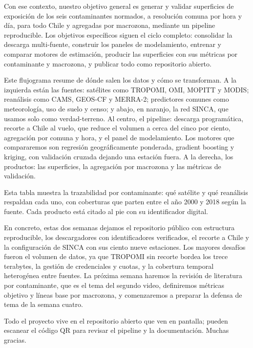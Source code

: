 Con ese contexto, nuestro objetivo general es generar y validar superficies de exposición de los seis contaminantes normados, a resolución comuna por hora y día, para todo Chile y agregadas por macrozona, mediante un pipeline reproducible. Los objetivos específicos siguen el ciclo completo: consolidar la descarga multi-fuente, construir los paneles de modelamiento, entrenar y comparar motores de estimación, producir las superficies con sus métricas por contaminante y macrozona, y publicar todo como repositorio abierto.

Este flujograma resume de dónde salen los datos y cómo se transforman. A la izquierda están las fuentes: satélites como TROPOMI, OMI, MOPITT y MODIS; reanálisis como CAMS, GEOS-CF y MERRA-2; predictores comunes como meteorología, uso de suelo y censo; y abajo, en naranjo, la red SINCA, que usamos solo como verdad-terreno. Al centro, el pipeline: descarga programática, recorte a Chile al vuelo, que reduce el volumen a cerca del cinco por ciento, agregación por comuna y hora, y el panel de modelamiento. Los motores que compararemos son regresión geográficamente ponderada, gradient boosting y kriging, con validación cruzada dejando una estación fuera. A la derecha, los productos: las superficies, la agregación por macrozona y las métricas de validación.

Esta tabla muestra la trazabilidad por contaminante: qué satélite y qué reanálisis respaldan cada uno, con coberturas que parten entre el año 2000 y 2018 según la fuente. Cada producto está citado al pie con su identificador digital.

 En concreto, estas dos semanas dejamos el repositorio público con estructura reproducible, los descargadores con identificadores verificados, el recorte a Chile y la configuración de SINCA con sus ciento nueve estaciones.  Los mayores desafíos fueron el volumen de datos, ya que TROPOMI sin recorte bordea los trece terabytes, la gestión de credenciales y cuotas, y la cobertura temporal heterogénea entre fuentes.  La próxima semana haremos la revisión de literatura por contaminante, que es el tema del segundo video, definiremos métricas objetivo y líneas base por macrozona, y comenzaremos a preparar la defensa de tema de la semana cuatro.

Todo el proyecto vive en el repositorio abierto que ven en pantalla; pueden escanear el código QR para revisar el pipeline y la documentación. Muchas gracias.


